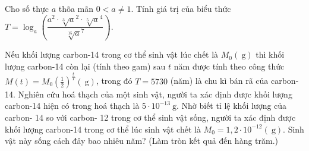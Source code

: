 
\TL
\begin{ex}%
Cho số thực $a$ thõa mãn $0<a \neq 1$. Tính giá trị của biểu thức $T=\log _a\left(\dfrac{a^2 \cdot \sqrt[3]a^2 \cdot \sqrt[5]a^4}{\sqrt[15]a^7}\right)$.
\end{ex}

\begin{ex}%
	Nếu khối lượng carbon-14 trong cơ thể sinh vật lúc chết là $M_0(\mathrm{~g})$ thì khối lượng carbon-14 còn lại (tính theo gam) sau $t$ năm được tính theo công thức $M(t)=M_0\left(\frac{1}{2}\right)^{\frac{t}{T}}(\mathrm{~g})$, trong đó $T=5730$ (năm) là chu kì bán rã của carbon-14. Nghiên cứu hoá thạch của một sinh vật, người ta xác định được khối lượng carbon-14 hiện có trong hoá thạch là $5 \cdot 10^{-13} \mathrm{~g}$. Nhờ biết tỉ lệ khối lượng của carbon- 14 so với carbon- 12 trong cơ thể sinh vật sống, người ta xác định được khối lượng carbon-14 trong cơ thể lúc sinh vật chết là $M_0=1,2 \cdot 10^{-12}(\mathrm{~g})$. Sinh vật này sống cách đây bao nhiêu năm? (Làm tròn kết quả đến hàng trăm.)
\end{ex}

